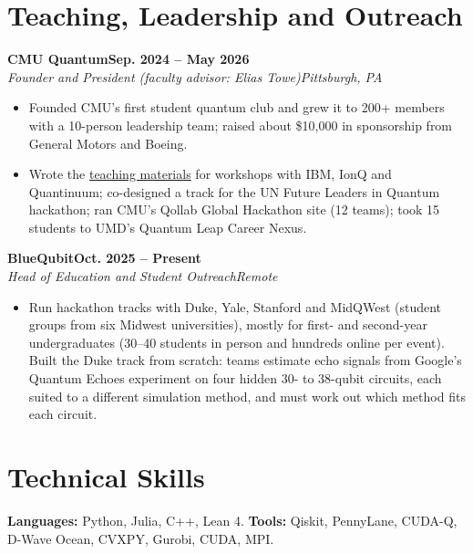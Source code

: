 \documentclass[letterpaper,10pt]{article}
\newcommand{\entry}[4]{%
  \par\vspace{3pt}\noindent\textbf{#1}\hfill\textbf{\small #2}\\
  \textit{\small #3}\hfill\textit{\small #4}\par}
\begin{document}
\section{Teaching, Leadership and Outreach}
\entry{CMU Quantum}{Sep. 2024 -- May 2026}{Founder and President (faculty advisor: Elias Towe)}{Pittsburgh, PA}
\begin{itemize}\small
  \item Founded CMU's first student quantum club and grew it to 200+ members with a 10-person leadership team;
  raised about \$10,000 in sponsorship from General Motors and Boeing.
  \item Wrote the  \href{https://drive.google.com/file/d/1V5-msJkDjIr6-rSO2Juw5q21DpHwTdrh/view?usp=sharing}{teaching materials}
  for workshops with IBM, IonQ and Quantinuum; co-designed a track for the UN Future Leaders in
  Quantum hackathon; ran CMU's Qollab Global Hackathon site (12 teams); took 15 students to UMD's Quantum
  Leap Career Nexus.
\end{itemize}
\entry{BlueQubit}{Oct. 2025 -- Present}{Head of Education and Student Outreach}{Remote}
\begin{itemize}\small
  \item Run hackathon tracks with Duke, Yale, Stanford and MidQWest (student groups from six Midwest universities), mostly for first- and second-year undergraduates
  (30--40 students in person and hundreds online per event). Built the Duke track from scratch: teams estimate
  echo signals from Google's Quantum Echoes experiment on four hidden 30- to 38-qubit circuits, each suited to a
  different simulation method, and must work out which method fits each circuit.
\end{itemize}

\section{Technical Skills}
\small
\textbf{Languages:} Python, Julia, C++, Lean 4. \textbf{Tools:} Qiskit, PennyLane, CUDA-Q, D-Wave Ocean, CVXPY, Gurobi, CUDA, MPI.
\normalsize
\end{document}
